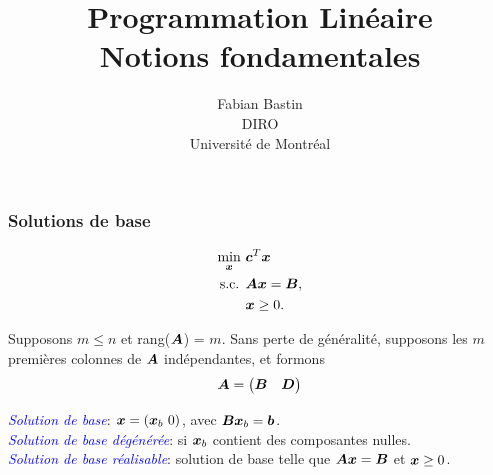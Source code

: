\documentclass[usepdftitle=false]{beamer}
\title[Notions fondamentales]{Programmation Linéaire\\Notions fondamentales}
\author[Fabian Bastin]{Fabian Bastin\\DIRO\\Université de Montréal}
\date{}
\begin{document}
\frame{\titlepage}

\begin{frame}


\frametitle{Solutions de base}

\begin{align*}
\min_{{\boldsymbol{x}}}\ & {\boldsymbol{c}}^T {\boldsymbol{x}} \\
\mbox{s.c. } & {\boldsymbol{A}} {\boldsymbol{x}} = {\boldsymbol{B}}, \\
 & {\boldsymbol{x}} \geq 0.
\end{align*}

\mbox{}

Supposons $m \leq n$ et rang(${\boldsymbol{A}}$) = $m$.
Sans perte de généralité, supposons les $m$ premières colonnes de ${\boldsymbol{A}}$ indépendantes, et formons
\[
{\boldsymbol{A}} =
\begin{pmatrix}
 {\boldsymbol{B}} & {\boldsymbol{D}}
\end{pmatrix}
\]

\mbox{}

{\it \textcolor{blue}{Solution de base}}: $\bsx = (\bsx_b \ 0)$, avec ${\boldsymbol{B}}{\boldsymbol{x}}_b = {\boldsymbol{b}}$.\\
{\it \textcolor{blue}{Solution de base dégénérée}}: si ${\boldsymbol{x}}_b$ contient des composantes nulles. \\
{\it \textcolor{blue}{Solution de base réalisable}}: solution de base telle que ${\boldsymbol{A}}{\boldsymbol{x}} = {\boldsymbol{B}}$ et ${\boldsymbol{x}} \geq 0$.
\end{frame}
\end{document}

